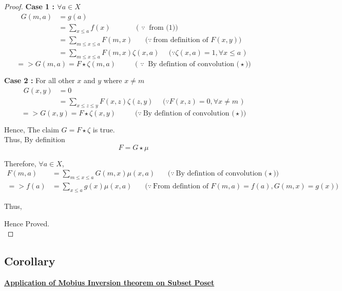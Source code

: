 \begin{proof}
\textbf{Case 1 : $\forall a \in X$}
\begin{align*}
    G(m,a) &= g(a)\\
    &= \sum_{x \le a} f(x) ~~~~~~~~~~~~~~~~ \textrm{( $\because~$ from (1))}\\
    &= \sum_{m \le x \le a} F(m,x) ~~~~~~~~ \textrm{($\because~$from definition of $F(x,y)$)}\\
    &= \sum_{m \le x \le a} F(m,x) \zeta(x,a) ~~~~~~\textrm{($\because \zeta (x,a) = 1, \forall x \le a$ )}
\end{align*}
$$=> \boxed{G(m,a) = F \star \zeta (m,a)} ~~~~~~~~~~~~ \textrm{( $\because~$ By defintion of convolution ($\star$))}$$

\textbf{Case 2 :} For all other $x$ and $y$ where $x \ne m$
\begin{align*}
    G(x,y) &= 0\\
    &= \sum_{x \le z \le y} F(x,z) \zeta(z,y) ~~~~~~\textrm{($\because F(x,z) = 0, \forall x \ne m$ )}
\end{align*}
$$=> \boxed{G(x,y) = F \star \zeta (x,y)} ~~~~~~~~~~~~ \textrm{($\because~$By defintion of convolution ($\star$))}$$

\noindent Hence, The claim $G = F \star \zeta $ is true.\\

\noindent Thus, By definition
$$\boxed{F = G \star \mu}$$

\noindent Therefore, $\forall a \in X$,
\begin{align*}
    F(m,a) &= \sum_{m \le x \le a} G(m,x) \mu(x,a) ~~~~~~~~ \textrm{($\because~$By defintion of convolution ($\star$))}\\
 => f(a)  &=\sum_{x \le a} g(x) \mu(x,a) ~~~~~~~~ \textrm{($\because~$From defintion of $F(m,a) = f(a), G(m,x) = g(x)$)}
\end{align*}

\noindent Thus,
\begin{center}
\end{center}

Hence Proved.\\

\end{proof}

\subsection{Corollary}

\noindent \underline{\textbf{Application of Mobius Inversion theorem on Subset Poset}}\\

